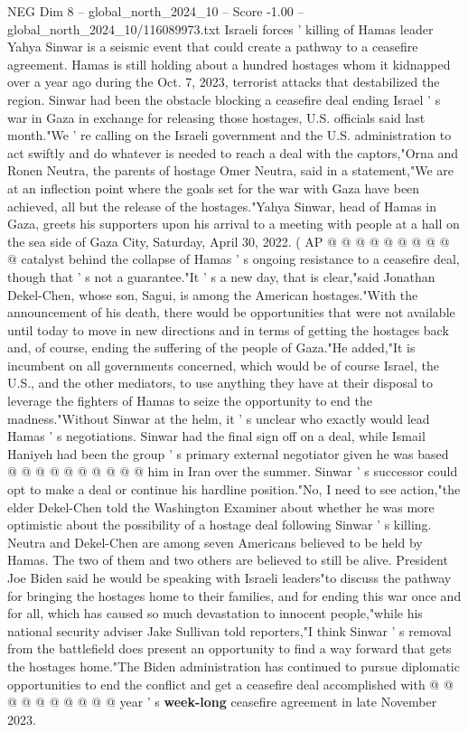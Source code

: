 \begin{textsample}{NEG Dim 8 – global\_north\_2024\_10 – Score -1.00 – global\_north\_2024\_10/116089973.txt}  \label{ex:f8_neg_199}
Israeli forces ' killing of Hamas leader Yahya Sinwar is a seismic event that could create a pathway to a ceasefire agreement.
Hamas is still holding about a hundred hostages whom it kidnapped over a year ago during the Oct. 7, 2023, terrorist attacks that destabilized the region.
Sinwar had been the obstacle blocking a ceasefire deal ending Israel ' s war in Gaza in exchange for releasing those hostages, U.S. officials said last month."We ' re calling on the Israeli government and the U.S. administration to act swiftly and do whatever is needed to reach a deal with the captors,"Orna and Ronen Neutra, the parents of hostage Omer Neutra, said in a statement,"We are at an inflection point where the goals set for the war with Gaza have been achieved, all but the release of the hostages."Yahya Sinwar, head of Hamas in Gaza, greets his supporters upon his arrival to a meeting with people at a hall on the sea side of Gaza City, Saturday, April 30, 2022. ( AP @ @ @ @ @ @ @ @ @ @ catalyst behind the collapse of Hamas ' s ongoing resistance to a ceasefire deal, though that ' s not a guarantee."It ' s a new day, that is clear,"said Jonathan Dekel-Chen, whose son, Sagui, is among the American hostages."With the announcement of his death, there would be opportunities that were not available until today to move in new directions and in terms of getting the hostages back and, of course, ending the suffering of the people of Gaza."He added,"It is incumbent on all governments concerned, which would be of course Israel, the U.S., and the other mediators, to use anything they have at their disposal to leverage the fighters of Hamas to seize the opportunity to end the madness."Without Sinwar at the helm, it ' s unclear who exactly would lead Hamas ' s negotiations.
Sinwar had the final sign off on a deal, while Ismail Haniyeh had been the group ' s primary external negotiator given he was based @ @ @ @ @ @ @ @ @ @ him in Iran over the summer.
Sinwar ' s successor could opt to make a deal or continue his hardline position."No, I need to see action,"the elder Dekel-Chen told the Washington Examiner about whether he was more optimistic about the possibility of a hostage deal following Sinwar ' s killing.
Neutra and Dekel-Chen are among seven Americans believed to be held by Hamas.
The two of them and two others are believed to still be alive.
President Joe Biden said he would be speaking with Israeli leaders"to discuss the pathway for bringing the hostages home to their families, and for ending this war once and for all, which has caused so much devastation to innocent people,"while his national security adviser Jake Sullivan told reporters,"I think Sinwar ' s removal from the battlefield does present an opportunity to find a way forward that gets the hostages home."The Biden administration has continued to pursue diplomatic opportunities to end the conflict and get a ceasefire deal accomplished with @ @ @ @ @ @ @ @ @ @ year ' s \textbf{week-long} ceasefire agreement in late November 2023.

\end{textsample}
